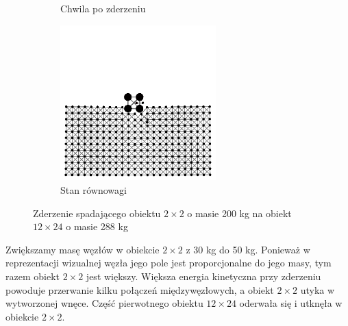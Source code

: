 \documentclass[12pt, letterpaper]{report}
\begin{document}
\begin{figure}[h]
\begin{subfigure}{0.5\textwidth}
            \caption{Chwila po zderzeniu}
        \end{subfigure}
        \begin{subfigure}{0.5\textwidth}
            \centering
            \includegraphics[width=6cm, height=6cm]{collision_2x2_24x12_mass50_4}
            \caption{Stan równowagi}
        \end{subfigure}
        
        \caption{Zderzenie spadającego obiektu $2 \times 2$ o masie 200 kg na obiekt $12 \times 24$ o masie 288 kg}
    \end{figure}

    Zwiększamy masę węzłów w obiekcie $2 \times 2$ z 30 kg do 50 kg. Ponieważ w reprezentacji wizualnej węzła jego pole 
    jest proporcjonalne do jego masy, tym razem obiekt $2 \times 2$ jest większy.
    Większa energia kinetyczna przy zderzeniu powoduje przerwanie kilku połączeń międzywęzłowych, a obiekt $2 \times 2$ 
    utyka w wytworzonej wnęce. Część pierwotnego obiektu $12 \times 24$ oderwała się i utknęła w obiekcie $2 \times 2$.

    \clearpage
\end{document}

